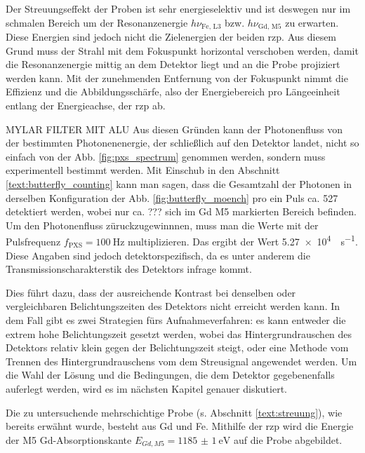 \noindent
Der Streuungseffekt der Proben ist sehr energieselektiv und ist deswegen nur im schmalen Bereich um der Resonanzenergie $h\nu_{\text{Fe, L3}}$ bzw. $h\nu_{\text{Gd, M5}}$ zu erwarten. Diese Energien sind jedoch nicht die Zielenergien der beiden \gls{rzp}. Aus diesem Grund muss der Strahl mit dem Fokuspunkt horizontal verschoben werden, damit die Resonanzenergie mittig an dem Detektor liegt und an die Probe projiziert werden kann. Mit der zunehmenden Entfernung von der Fokuspunkt nimmt die Effizienz und die Abbildungsschärfe, also der Energiebereich pro Längeeinheit entlang der Energieachse, der \gls{rzp} ab.

MYLAR FILTER MIT ALU
\noindent
Aus diesen Gründen kann der Photonenfluss von der bestimmten Photonenenergie, der schließlich auf den Detektor landet, nicht so einfach von der Abb. \ref{fig:pxs_spectrum} genommen werden, sondern muss experimentell bestimmt werden. Mit Einschub in den Abschnitt \ref{text:butterfly_counting} kann man sagen, dass die Gesamtzahl der Photonen in derselben Konfiguration der Abb. \ref{fig:butterfly_moench} pro ein Puls ca. 527 detektiert werden, wobei nur ca. ??? sich im Gd M5 markierten Bereich befinden. Um den Photonenfluss züruckzugewinnnen, muss man die Werte mit der Pulsfrequenz $f_\text{PXS} = \SI{100}{\hertz}$ multiplizieren. Das ergibt der Wert \SI{5.27e4}{\photons\per\second}.  Diese Angaben sind jedoch detektorspezifisch, da es unter anderem die Transmissionscharakterstik des Detektors infrage kommt.

\noindent
Dies führt dazu, dass der ausreichende Kontrast bei denselben oder vergleichbaren Belichtungszeiten des Detektors nicht erreicht werden kann. In dem Fall gibt es zwei Strategien fürs Aufnahmeverfahren: es kann entweder die extrem hohe Belichtungszeit gesetzt werden, wobei das Hintergrundrauschen des Detektors relativ klein gegen der Belichtungszeit steigt, oder eine Methode vom Trennen des Hintergrundrauschens vom dem Streusignal angewendet werden. Um die Wahl der Lösung und die Bedingungen, die dem Detektor gegebenenfalls auferlegt werden, wird es im nächsten Kapitel genauer diskutiert. 

\noindent
Die zu untersuchende mehrschichtige Probe (s. Abschnitt \ref{text:streuung}), wie bereits erwähnt wurde, besteht aus Gd und Fe. Mithilfe der \gls{rzp} wird die Energie der M5 Gd-Absorptionskante $E_{Gd, M5} = \SI{1185(1)}{\eV}$ \cite[Abb. 6(a)]{prieto_x-ray_2005} auf die Probe abgebildet.